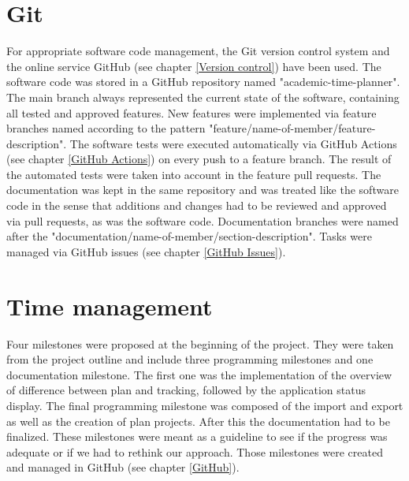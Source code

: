 \section{Git}
For appropriate software code management, the Git version control system and the online service GitHub (see chapter \ref{Version control}) have been used. The software code was stored in a GitHub repository named "academic-time-planner". The main branch always represented the current state of the software, containing all tested and approved features. New features were implemented via feature branches named according to the pattern "feature/name-of-member/feature-description". The software tests were executed automatically via GitHub Actions (see chapter \ref{GitHub Actions}) on every push to a feature branch. The result of the automated tests were taken into account in the feature pull requests. The documentation was kept in the same repository and was treated like the software code in the sense that additions and changes had to be reviewed and approved via pull requests, as was the software code. Documentation branches were named after the "documentation/name-of-member/section-description". Tasks were managed via GitHub issues (see chapter \ref{GitHub Issues}).

\section{Time management} \label{Time management}
Four milestones were proposed at the beginning of the project. They were taken from the project outline and include three programming milestones and one documentation milestone. The first one was the implementation of the overview of difference between plan and tracking, followed by the application status display. The final programming milestone was composed of the import and export as well as the creation of plan projects. After this the documentation had to be finalized. These milestones were meant as a guideline to see if the progress was adequate or if we had to rethink our approach. Those milestones were created and managed in GitHub (see chapter \ref{GitHub}). 



